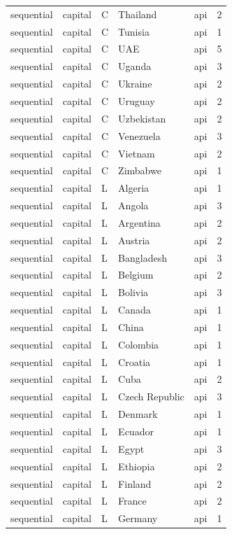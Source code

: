 \begin{tabular}{lllllr}
sequential & capital & C & Thailand & api & 2 \\
sequential & capital & C & Tunisia & api & 1 \\
sequential & capital & C & UAE & api & 5 \\
sequential & capital & C & Uganda & api & 3 \\
sequential & capital & C & Ukraine & api & 2 \\
sequential & capital & C & Uruguay & api & 2 \\
sequential & capital & C & Uzbekistan & api & 2 \\
sequential & capital & C & Venezuela & api & 3 \\
sequential & capital & C & Vietnam & api & 2 \\
sequential & capital & C & Zimbabwe & api & 1 \\
sequential & capital & L & Algeria & api & 1 \\
sequential & capital & L & Angola & api & 3 \\
sequential & capital & L & Argentina & api & 2 \\
sequential & capital & L & Austria & api & 2 \\
sequential & capital & L & Bangladesh & api & 3 \\
sequential & capital & L & Belgium & api & 2 \\
sequential & capital & L & Bolivia & api & 3 \\
sequential & capital & L & Canada & api & 1 \\
sequential & capital & L & China & api & 1 \\
sequential & capital & L & Colombia & api & 1 \\
sequential & capital & L & Croatia & api & 1 \\
sequential & capital & L & Cuba & api & 2 \\
sequential & capital & L & Czech Republic & api & 3 \\
sequential & capital & L & Denmark & api & 1 \\
sequential & capital & L & Ecuador & api & 1 \\
sequential & capital & L & Egypt & api & 3 \\
sequential & capital & L & Ethiopia & api & 2 \\
sequential & capital & L & Finland & api & 2 \\
sequential & capital & L & France & api & 2 \\
sequential & capital & L & Germany & api & 1 \\

\end{tabular}
